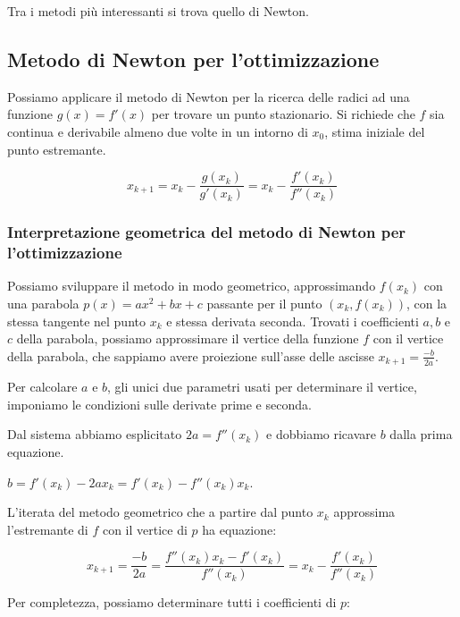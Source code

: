 \documentclass[12pt]{article}
\theoremstyle{plain}%
\theoremstyle{definition}
\theoremstyle{remark}
\begin{document}
Tra i metodi più interessanti si trova quello di Newton.

\subsection{Metodo di Newton per l'ottimizzazione}

Possiamo applicare il metodo di Newton per la ricerca delle radici ad una
funzione $g(x) = f'(x)$ per trovare un punto stazionario. Si richiede che $f$
sia continua e derivabile almeno due volte in un intorno di $x_0$, stima iniziale
del punto estremante.

$$x_{k + 1} = x_k - \frac{g(x_k)}{g'(x_k)} = x_k - \frac{f'(x_k)}{f''(x_k)}$$

\subsubsection[Interpretazione geometrica]{Interpretazione geometrica del metodo di Newton per l'ottimizzazione}

Possiamo sviluppare il metodo in modo geometrico, approssimando $f(x_k)$ con una parabola $p(x) = a x^2 + bx + c$
passante per il punto $\left(x_k, f(x_k)\right)$, con la stessa tangente nel punto $x_k$ e stessa derivata seconda.
Trovati i coefficienti $a, b$ e $c$ della parabola, possiamo approssimare il vertice della funzione $f$
con il vertice della parabola, che sappiamo avere proiezione sull'asse delle ascisse $x_{k+1} = \frac{-b}{2a}$.

Per calcolare $a$ e $b$, gli unici due parametri usati per determinare il vertice, imponiamo le condizioni sulle
derivate prime e seconda.


Dal sistema abbiamo esplicitato $2a = f''(x_k)$ e dobbiamo ricavare $b$ dalla prima equazione.

$b = f'(x_k) - 2a x_k = f'(x_k) - f''(x_k) x_k$.

L'iterata del metodo geometrico che a partire dal punto $x_k$ approssima l'estremante di $f$
con il vertice di $p$ ha equazione:

$$x_{k+1} = \frac{-b}{2a} = \frac{f''(x_k) x_k - f'(x_k)}{f''(x_k)} = x_k - \frac{f'(x_k)}{f''(x_k)}$$

Per completezza, possiamo determinare tutti i coefficienti di $p$:

\end{document}
